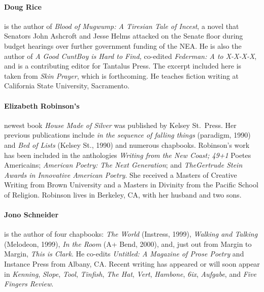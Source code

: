 \documentclass[
]{memoir}
\begin{document}
\hypertarget{doug-rice}{%
\paragraph{Doug Rice}\label{doug-rice}}

is the author of \emph{Blood of Mugwump: A Tiresian Tale of Incest}, a
novel that Senators John Ashcroft and Jesse Helms attacked on the Senate
floor during budget hearings over further government funding of the NEA.
He is also the author of \emph{A Good CuntBoy is Hard to Find,}
co-edited \emph{Federman: A to X-X-X-X}, and is a contributing editor
for Tantalus Press. The excerpt included here is taken from \emph{Skin
Prayer}, which is forthcoming. He teaches fiction writing at California
State University, Sacramento.

\hypertarget{elizabeth-robinsons}{%
\paragraph{Elizabeth Robinson's}\label{elizabeth-robinsons}}

newest book \emph{House Made of Silver} was published by Kelsey
St.~Press. Her previous publications include \emph{in the sequence of
falling things} (paradigm, 1990) and \emph{Bed of Lists} (Kelsey St.,
1990) and numerous chapbooks. Robinson's work has been included in the
anthologies \emph{Writing from the New Coast; 49+1} Poetes Americains;
\emph{American Poetry: The Next Generation}; and \emph{TheGertrude Stein
Awards in Innovative American Poetry}. She received a Masters of
Creative Writing from Brown University and a Masters in Divinity from
the Pacific School of Religion. Robinson lives in Berkeley, CA, with her
husband and two sons.

\hypertarget{jono-schneider}{%
\paragraph{Jono Schneider}\label{jono-schneider}}

is the author of four chapbooks: \emph{The World} (Instress, 1999),
\emph{Walking and Talking} (Melodeon, 1999), \emph{In the Room} (A+
Bend, 2000), and, just out from Margin to Margin, \emph{This is Clark}.
He co-edits \emph{Untitled: A Magazine of Prose Poetry} and Instance
Press from Albany, CA. Recent writing has appeared or will soon appear
in \emph{Kenning}, \emph{Slope}, \emph{Tool}, \emph{Tinfish}, \emph{The
Hat}, \emph{Vert}, \emph{Hambone}, \emph{6ix}, \emph{Aufgabe}, and
\emph{Five Fingers Review}.
\end{document}
